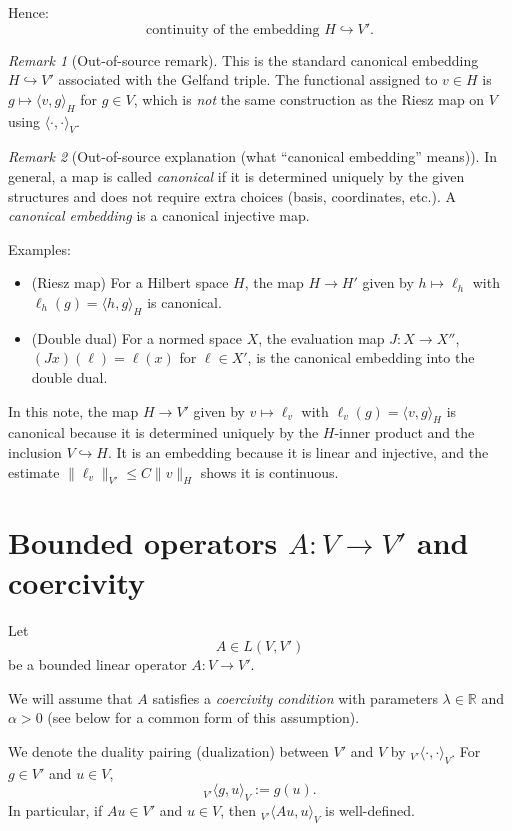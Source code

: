 \documentclass[11pt]{article}
\theoremstyle{definition}
\theoremstyle{remark}
\newtheorem{remark}{Remark}
\begin{document}
Hence:
\[
\text{continuity of the embedding } H \hookrightarrow V'.
\]

\begin{remark}[Out-of-source remark]
This is the standard canonical embedding $H \hookrightarrow V'$ associated with the Gelfand triple. The functional assigned to $v\in H$ is $g\mapsto \langle v,g\rangle_H$ for $g\in V$, which is \emph{not} the same construction as the Riesz map on $V$ using $\langle \cdot,\cdot\rangle_V$.
\end{remark}

\begin{remark}[Out-of-source explanation (what ``canonical embedding'' means)]
In general, a map is called \emph{canonical} if it is determined uniquely by the given structures and does not require extra choices (basis, coordinates, etc.). A \emph{canonical embedding} is a canonical injective map.

Examples:
\begin{itemize}
\item (Riesz map) For a Hilbert space $H$, the map $H\to H'$ given by $h\mapsto \ell_h$ with $\ell_h(g)=\langle h,g\rangle_H$ is canonical.
\item (Double dual) For a normed space $X$, the evaluation map $J:X\to X''$, $(Jx)(\ell)=\ell(x)$ for $\ell\in X'$, is the canonical embedding into the double dual.
\end{itemize}

In this note, the map $H\to V'$ given by $v\mapsto \ell_v$ with $\ell_v(g)=\langle v,g\rangle_H$ is canonical because it is determined uniquely by the $H$-inner product and the inclusion $V\hookrightarrow H$. It is an embedding because it is linear and injective, and the estimate $\|\ell_v\|_{V'}\le C\|v\|_H$ shows it is continuous.
\end{remark}

\section*{Bounded operators $A:V\to V'$ and coercivity}

Let
\[
A \in L(V,V')
\]
be a bounded linear operator $A:V\to V'$.

We will assume that $A$ satisfies a \emph{coercivity condition} with parameters $\lambda\in\mathbb{R}$ and $\alpha>0$ (see below for a common form of this assumption).

We denote the duality pairing (dualization) between $V'$ and $V$ by ${}_{V'}\langle\cdot,\cdot\rangle_V$. For $g\in V'$ and $u\in V$,
\[
{}_{V'}\langle g,u\rangle_V := g(u).
\]
In particular, if $Au\in V'$ and $u\in V$, then ${}_{V'}\langle Au,u\rangle_V$ is well-defined.
\end{document}
